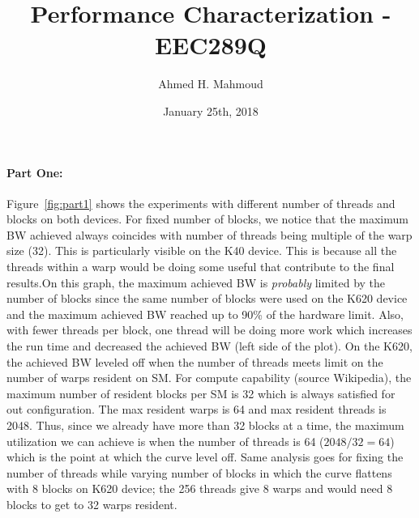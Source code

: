 \documentclass[12pt] {article}
\begin{document}
\title{Performance Characterization -  EEC289Q}
\author{Ahmed H. Mahmoud}
\date{January 25th, 2018}
\maketitle

\paragraph{Part One:}
Figure~\ref{fig:part1} shows the experiments with different number of threads and blocks on both devices. For fixed number of blocks, we notice that the maximum BW achieved always coincides with number of threads being multiple of the warp size (32). This is particularly visible on the K40 device. This is because all the threads within a warp would be doing some useful that contribute to the final results.On this graph, the maximum achieved BW is \emph{probably} limited by the number of blocks since the same number of blocks were used on the K620 device and the maximum achieved BW reached up to 90\% of the hardware limit. Also, with fewer threads per block, one thread will be doing more work which increases the run time and decreased the achieved BW (left side of the plot). On the K620, the achieved BW leveled off when the number of threads meets limit on the number of warps resident on SM. For compute capability (source Wikipedia), the maximum number of resident blocks per SM is 32 which is always satisfied for out configuration. The max resident warps is 64 and max resident threads is 2048. Thus, since we already have more than 32 blocks at a time, the maximum utilization we can achieve is when the number of threads is 64 ($2048/32=64$) which is the point at which the curve level off. Same analysis goes for fixing the number of threads while varying number of blocks in which the curve flattens with 8 blocks on K620 device; the 256 threads give 8 warps and would need 8 blocks to get to 32 warps resident. 
\end{document}
